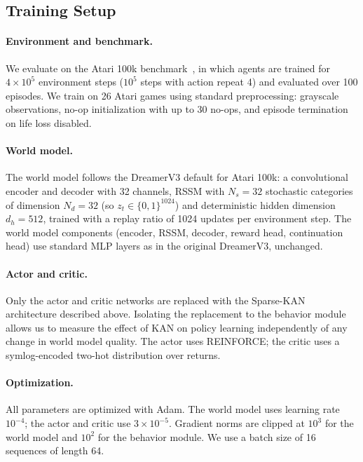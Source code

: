\documentclass[11pt, a4paper]{article}
\begin{document}
\subsection{Training Setup}

\paragraph{Environment and benchmark.}
We evaluate on the Atari 100k benchmark~\cite{kaiser2020atari100k}, in which
agents are trained for $4 \times 10^5$ environment steps ($10^5$ steps with
action repeat 4) and evaluated over 100 episodes. We train on 26 Atari games
using standard preprocessing: grayscale observations, no-op initialization with
up to 30 no-ops, and episode termination on life loss disabled.

\paragraph{World model.}
The world model follows the DreamerV3 default for Atari 100k: a convolutional
encoder and decoder with 32 channels, RSSM with $N_s = 32$ stochastic
categories of dimension $N_d = 32$ (so $z_t \in \{0,1\}^{1024}$) and
deterministic hidden dimension $d_h = 512$, trained with a replay ratio of
1024 updates per environment step. The world model components (encoder, RSSM,
decoder, reward head, continuation head) use standard MLP layers as in the
original DreamerV3, unchanged.

\paragraph{Actor and critic.}
Only the actor and critic networks are replaced with the Sparse-KAN
architecture described above. Isolating the replacement to the behavior module
allows us to measure the effect of KAN on policy learning independently of any
change in world model quality. The actor uses REINFORCE; the critic uses a
symlog-encoded two-hot distribution over returns.

\paragraph{Optimization.}
All parameters are optimized with Adam. The world model uses learning rate
$10^{-4}$; the actor and critic use $3 \times 10^{-5}$. Gradient norms are
clipped at $10^3$ for the world model and $10^2$ for the behavior module. We
use a batch size of 16 sequences of length 64.
\end{document}
